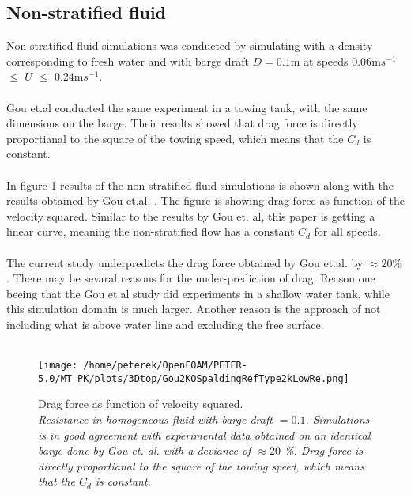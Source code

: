 \documentclass[a4paper, 12pt]{report}
\begin{document}
\subsection{Non-stratified fluid}
Non-stratified fluid simulations was conducted by simulating with a density corresponding to fresh water and with barge draft $D=0.1$m at speeds $0.06$m$s^{-1}$ $\leq$ $U$ $\leq$ $0.24$m$s^{-1}$. \\
\\
Gou et.al conducted the same experiment in a towing tank, with the same dimensions on the barge. Their results showed that drag force is directly proportianal to the square of the towing speed, which means that the $C_d$ is constant.\\
\\
In figure \ref{fig:dragForce} results of the non-stratified fluid simulations is shown along with the results obtained by Gou et.al. \cite{Gou}. The figure is showing drag force as function of the velocity squared. Similar to the results by Gou et. al, this paper is getting a linear curve, meaning the non-stratified flow has a constant $C_d$ for all speeds.\\
\\
The current study underpredicts the drag force obtained by Gou et.al. by $\approx 20\%$. There may be sevaral reasons for the under-prediction of drag. Reason one beeing that the Gou et.al study did experiments in a shallow water tank, while this simulation domain is much larger. Another reason is the approach of not including what is above water line and excluding the free surface.\\
\\
\begin{figure}[H]
	\centering
	\texttt{[image: /home/peterek/OpenFOAM/PETER-5.0/MT\_PK/plots/3Dtop/Gou2KOSpaldingRefType2kLowRe.png]}
	\caption{Drag force as function of velocity squared. \\ \textit{Resistance in homogeneous fluid with barge draft $=0.1$. Simulations is in good agreement with experimental data obtained on an identical barge done by Gou et. al. \cite{Gou} with a deviance of $\approx 20$ \%. Drag force is directly proportianal to the square of the towing speed, which means that the $C_d$ is constant. }}
	\label{fig:dragForce}
\end{figure}
\end{document}
